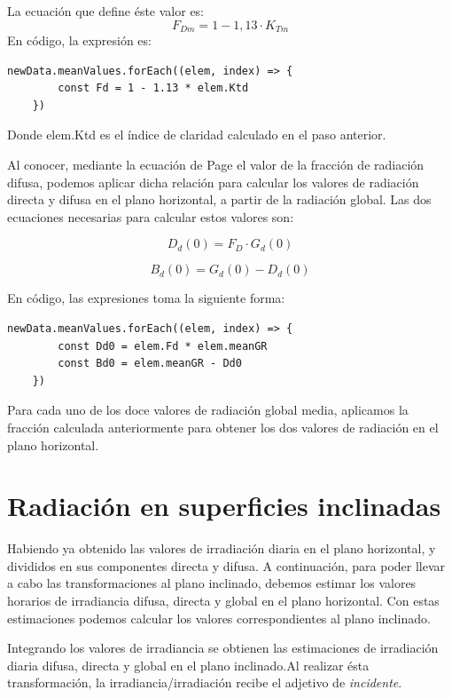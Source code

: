 La ecuación que define éste valor es:
\begin{equation}\label{eqn:page}
F_{Dm}=1-1,13·K_{Tm}
\end{equation}
En código, la expresión es:
\begin{lstlisting}[style=ES6, caption={Fracción de difusa}]
	newData.meanValues.forEach((elem, index) => {
		const Fd = 1 - 1.13 * elem.Ktd
	})
\end{lstlisting}
Donde elem.Ktd es el índice de claridad calculado en el paso anterior.

Al conocer, mediante la ecuación de Page el valor de la fracción de radiación difusa, podemos aplicar dicha relación para calcular los valores de radiación directa y difusa en el plano horizontal, a partir de la radiación global.
Las dos ecuaciones necesarias para calcular estos valores son:

\begin{equation}
\label{eqn:rad_difusa}
D_d(0) = F_D · G_d(0)
\end{equation}

\begin{equation}
\label{eqn:rad_directa}
B_d(0) = G_d(0) - D_d(0)
\end{equation}

En código, las expresiones toma la siguiente forma:
\begin{lstlisting}[style=ES6, caption={Radiación directa y difusa}]
	newData.meanValues.forEach((elem, index) => {
		const Dd0 = elem.Fd * elem.meanGR
		const Bd0 = elem.meanGR - Dd0
	})
\end{lstlisting}

Para cada uno de los doce valores de radiación global media, aplicamos la fracción calculada anteriormente para obtener los dos valores de radiación en el plano horizontal.

\section{Radiación en superficies inclinadas}

Habiendo ya obtenido las valores de irradiación diaria en el plano horizontal, y divididos en sus componentes directa y difusa.
A continuación, para poder llevar a cabo las transformaciones al plano inclinado, debemos estimar los valores horarios de irradiancia difusa, directa y global en el plano horizontal. Con estas estimaciones podemos calcular los valores correspondientes al plano inclinado.

Integrando los valores de irradiancia se obtienen las estimaciones de irradiación diaria difusa, directa y global en el plano inclinado.Al realizar ésta transformación, la irradiancia/irradiación recibe el adjetivo de \textit{incidente}.


